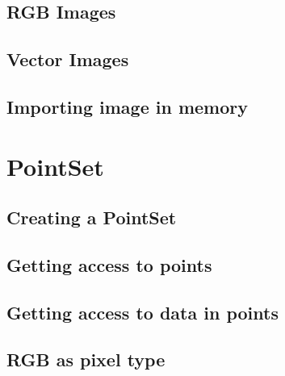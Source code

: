 


\subsection{RGB Images}
\label{sec:DefiningRGBImages}




\subsection{Vector Images}
\label{sec:DefiningVectorImages}




\subsection{Importing image in memory}
\label{sec:ImportingImagesInMemory}




\section{PointSet}
\label{PointSetSection}

\subsection{Creating a PointSet}
\label{sec:CreatingAPointSet}





\subsection{Getting access to points}
\label{sec:GettingAccessToPointsInThePointSet}





\subsection{Getting access to data in points}
\label{sec:GettingAccessToDataInThePointSet}





\subsection{RGB as pixel type}
\label{sec:PointSetWithRGBAsPixelType}

